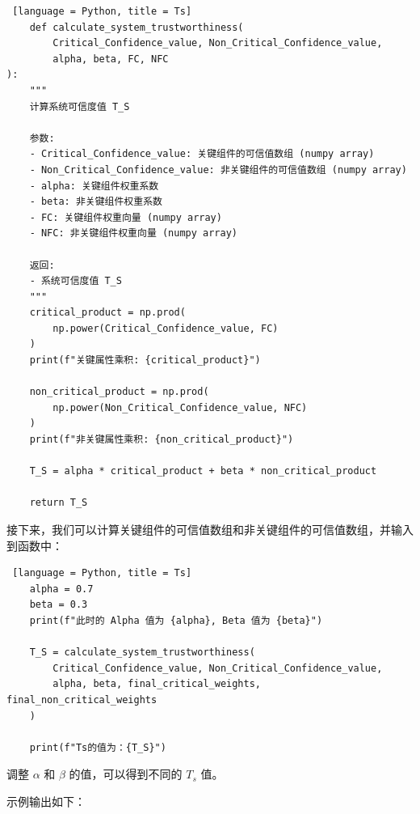 \documentclass[14pt,a4paper,UTF8,twoside]{article}
\begin{document}
\begin{lstlisting} [language = Python, title = Ts]
    def calculate_system_trustworthiness(
        Critical_Confidence_value, Non_Critical_Confidence_value,
        alpha, beta, FC, NFC
):
    """
    计算系统可信度值 T_S

    参数:
    - Critical_Confidence_value: 关键组件的可信值数组 (numpy array)
    - Non_Critical_Confidence_value: 非关键组件的可信值数组 (numpy array)
    - alpha: 关键组件权重系数
    - beta: 非关键组件权重系数
    - FC: 关键组件权重向量 (numpy array)
    - NFC: 非关键组件权重向量 (numpy array)

    返回:
    - 系统可信度值 T_S
    """
    critical_product = np.prod(
        np.power(Critical_Confidence_value, FC)
    )
    print(f"关键属性乘积: {critical_product}")

    non_critical_product = np.prod(
        np.power(Non_Critical_Confidence_value, NFC)
    )
    print(f"非关键属性乘积: {non_critical_product}")

    T_S = alpha * critical_product + beta * non_critical_product

    return T_S
\end{lstlisting}

接下来，我们可以计算关键组件的可信值数组和非关键组件的可信值数组，并输入到函数中：

\begin{lstlisting} [language = Python, title = Ts]
    alpha = 0.7
    beta = 0.3
    print(f"此时的 Alpha 值为 {alpha}, Beta 值为 {beta}")
    
    T_S = calculate_system_trustworthiness(
        Critical_Confidence_value, Non_Critical_Confidence_value,
        alpha, beta, final_critical_weights, final_non_critical_weights
    )
    
    print(f"Ts的值为：{T_S}")
\end{lstlisting}

调整 $\alpha$ 和 $\beta$ 的值，可以得到不同的 $T_s$ 值。

示例输出如下：
\end{document}

